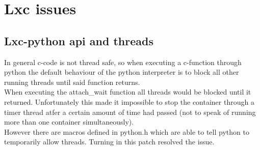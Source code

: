 \chapter{Lxc issues}

\section{Lxc-python api and threads}

In general c-code is not thread safe, so when executing a c-function through python the default
behaviour of the python interpreter is to block all other running threads until said function returns\cite{gil}.\\
When executing the attach\_wait function all threads would be blocked until it returned. Unfortunately
this made it impossible to stop the container through a timer thread atfer a certain amount of time had
passed (not to speak of running more than one container simultaneously).\\
However there are macros defined in python.h which are able to tell python to temporarily allow threads.
Turning in this patch\cite{bugreport} resolved the issue.
